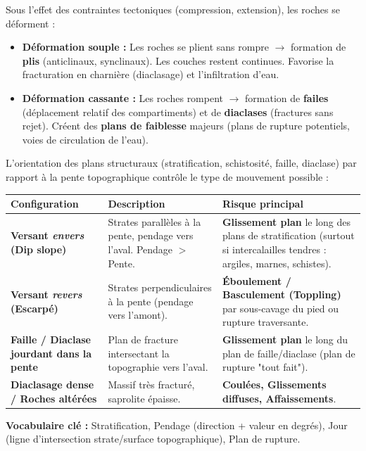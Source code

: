 \documentclass[11pt]{article}
\newcommand{\cle}[1]{{\popxbold\color{popdark}#1}}
\begin{document}
\begin{definition}
    Sous l'effet des contraintes tectoniques (compression, extension), les roches se déforment :
    \begin{itemize}
        \item \textbf{Déformation souple :} Les roches se plient sans rompre $\rightarrow$ formation de \textbf{plis} (anticlinaux, synclinaux). Les couches restent continues. Favorise la fracturation en charnière (diaclasage) et l'infiltration d'eau.
        \item \textbf{Déformation cassante :} Les roches rompent $\rightarrow$ formation de \textbf{failes} (déplacement relatif des compartiments) et de \textbf{diaclases} (fractures sans rejet). Créent des \textbf{plans de faiblesse} majeurs (plans de rupture potentiels, voies de circulation de l'eau).
    \end{itemize}
\end{definition}

\begin{propriete}
    L'orientation des plans structuraux (stratification, schistosité, faille, diaclase) par rapport à la pente topographique contrôle le type de mouvement possible :
    \begin{center}
        \begin{tabularx}{\linewidth}{|l|X|X|}\hline
        \rowcolor{popblueL} \textbf{Configuration} & \textbf{Description} & \textbf{Risque principal} \\ \hline
        \textbf{Versant \emph{envers} (Dip slope)} & Strates parallèles à la pente, pendage vers l'aval. Pendage $>$ Pente. & \textbf{Glissement plan} le long des plans de stratification (surtout si intercalailles tendres : argiles, marnes, schistes). \\ \hline
        \textbf{Versant \emph{revers} (Escarpé)} & Strates perpendiculaires à la pente (pendage vers l'amont). & \textbf{Éboulement / Basculement (Toppling)} par sous-cavage du pied ou rupture traversante. \\ \hline
        \textbf{Faille / Diaclase jourdant dans la pente} & Plan de fracture intersectant la topographie vers l'aval. & \textbf{Glissement plan} le long du plan de faille/diaclase (plan de rupture "tout fait"). \\ \hline
        \textbf{Diaclasage dense / Roches altérées} & Massif très fracturé, saprolite épaisse. & \textbf{Coulées, Glissements diffuses, Affaissements}. \\ \hline
        \end{tabularx}
    \end{center}
    \textbf{Vocabulaire clé :} \cle{Stratification}, \cle{Pendage} (direction + valeur en degrés), \cle{Jour} (ligne d'intersection strate/surface topographique), \cle{Plan de rupture}.
\end{propriete}
\end{document}
